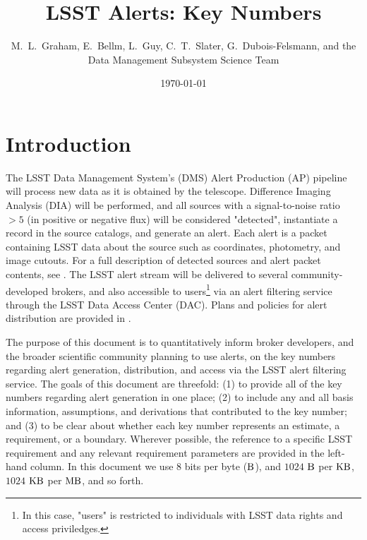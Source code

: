 \documentclass[DM,authoryear,toc]{lsstdoc}
\title[Alerts Key Numbers]{LSST Alerts: Key Numbers}
\author{%
M.~L.~Graham, E.~Bellm, L.~Guy, C.~T.~Slater, G.~Dubois-Felsmann, and the Data Management Subsystem Science Team
}
\date{\today}
\begin{document}
\maketitle

\section{Introduction} \label{sec:intro}

The LSST Data Management System's (DMS) Alert Production (AP) pipeline will process new data as it is obtained by the telescope. Difference Imaging Analysis (DIA) will be performed, and all sources with a signal-to-noise ratio $>5$ (in positive or negative flux) will be considered "detected", instantiate a record in the source catalogs, and generate an alert. 
Each alert is a packet containing LSST data about the source such as coordinates, photometry, and image cutouts. For a full description of detected sources and alert packet contents, see . The LSST alert stream will be delivered to several community-developed brokers, and also accessible to users\footnote{In this case, "users" is restricted to individuals with LSST data rights and access priviledges.} via an alert filtering service through the LSST Data Access Center (DAC). Plans and policies for alert distribution are provided in . 

The purpose of this document is to quantitatively inform broker developers, and the broader scientific community planning to use alerts, on the key numbers regarding alert generation, distribution, and access via the LSST alert filtering service. The goals of this document are threefold: (1) to provide all of the key numbers regarding alert generation in one place; (2) to include any and all basis information, assumptions, and derivations that contributed to the key number; and (3) to be clear about whether each key number represents an estimate, a requirement, or a boundary. Wherever possible, the reference to a specific LSST requirement and any relevant requirement parameters are provided in the left-hand column. In this document we use 8 bits per byte ($\rm B$), and $1024$ $\rm B$ per $\rm KB$, $1024$ $\rm KB$ per $\rm MB$, and so forth.
\end{document}
